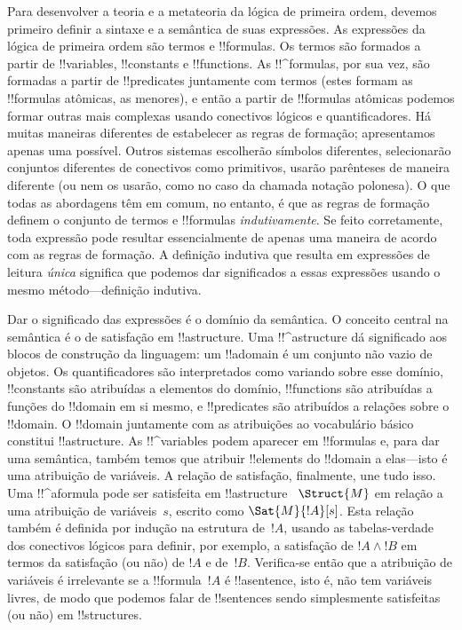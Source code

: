 \documentclass[../../../include/open-logic-section]{subfiles}
\begin{document}


Para desenvolver a teoria e a metateoria da lógica de primeira ordem,
devemos primeiro definir a sintaxe e a semântica de suas expressões.  As
expressões da lógica de primeira ordem são termos e !!{formula}s.  Os
termos são formados a partir de !!{variable}s, !!{constant}s e
!!{function}s. As !!^{formula}s, por sua vez, são formadas a partir de
!!{predicate}s juntamente com termos (estes formam as !!{formula}s
atômicas, as menores), e então a partir de !!{formula}s atômicas
podemos formar outras mais complexas usando conectivos lógicos e
quantificadores.  Há muitas maneiras diferentes de estabelecer as
regras de formação; apresentamos apenas uma possível. Outros sistemas
escolherão símbolos diferentes, selecionarão conjuntos diferentes de
conectivos como primitivos, usarão parênteses de maneira diferente (ou
nem os usarão, como no caso da chamada notação polonesa).  O que todas
as abordagens têm em comum, no entanto, é que as regras de formação
definem o conjunto de termos e !!{formula}s \emph{indutivamente}. Se
feito corretamente, toda expressão pode resultar essencialmente de
apenas uma maneira de acordo com as regras de formação.  A definição
indutiva que resulta em expressões de leitura \emph{única} significa
que podemos dar significados a essas expressões usando o mesmo
método---definição indutiva.

Dar o significado das expressões é o domínio da semântica.  O conceito
central na semântica é o de satisfação em !!a{structure}. Uma
!!^a{structure} dá significado aos blocos de construção da linguagem:
um !!a{domain} é um conjunto não vazio de objetos. Os quantificadores
são interpretados como variando sobre esse domínio, !!{constant}s são
atribuídas a elementos do domínio, !!{function}s são atribuídas a
funções do !!{domain} em si mesmo, e !!{predicate}s são atribuídos a
relações sobre o !!{domain}.  O !!{domain} juntamente com as
atribuições ao vocabulário básico constitui !!a{structure}. As
!!^{variable}s podem aparecer em !!{formula}s e, para dar uma semântica,
também temos que atribuir !!{element}s do !!{domain} a elas---isto é
uma atribuição de variáveis. A relação de satisfação, finalmente, une
tudo isso. Uma !!^a{formula} pode ser satisfeita em !!a{structure}
~$\Struct{M}$ em relação a uma atribuição de variáveis~$s$, escrito como
$\Sat{M}{!A}[s]$. Esta relação também é definida por indução na
estrutura de~$!A$, usando as tabelas-verdade dos conectivos lógicos
para definir, por exemplo, a satisfação de $!A \land !B$ em termos da
satisfação (ou não) de $!A$ e de~$!B$.  Verifica-se então que a
atribuição de variáveis é irrelevante se a !!{formula}~$!A$ é
!!a{sentence}, isto é, não tem variáveis livres, de modo que podemos
falar de !!{sentence}s sendo simplesmente satisfeitas (ou não) em
!!{structure}s.
\end{document}
